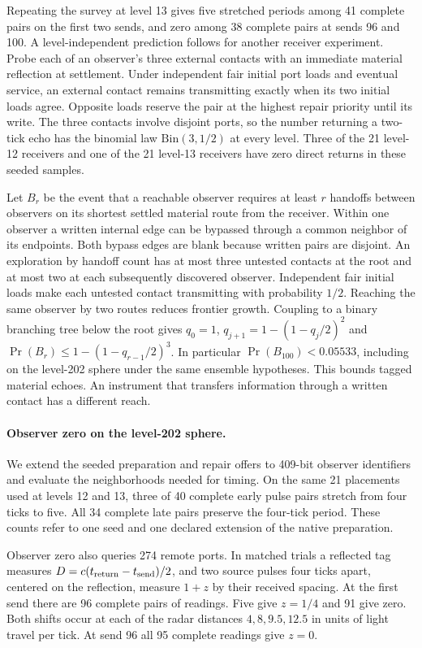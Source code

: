 \documentclass[11pt]{article}
\theoremstyle{remark}
\begin{document}
Repeating the survey at level 13 gives five stretched periods among
41 complete pairs on the first two sends, and zero among 38 complete
pairs at sends 96 and 100. A level-independent prediction follows for
another receiver experiment. Probe each of an observer's three external
contacts with an immediate material reflection at settlement. Under
independent fair initial port loads and eventual service, an external
contact remains transmitting exactly when its two initial loads agree.
Opposite loads reserve the pair at the highest repair priority until its
write. The three contacts involve disjoint ports, so the number returning
a two-tick echo has the binomial law $\mathrm{Bin}(3,1/2)$ at every level.
Three of the 21 level-12 receivers and one of the 21 level-13 receivers
have zero direct returns in these seeded samples.

Let $B_r$ be the event that a reachable observer requires at least $r$
handoffs between observers on its shortest settled material route from
the receiver. Within one observer a written internal edge can be bypassed
through a common neighbor of its endpoints. Both bypass edges are blank
because written pairs are disjoint. An exploration by handoff count has
at most three untested contacts at the root and at most two at each
subsequently discovered observer. Independent fair initial loads make
each untested contact transmitting with probability $1/2$. Reaching the
same observer by two routes reduces frontier growth. Coupling to
a binary branching tree below the root gives $q_0=1$,
$q_{j+1}=1-(1-q_j/2)^2$ and
$\Pr(B_r)\le 1-(1-q_{r-1}/2)^3$.
In particular $\Pr(B_{100})<0.05533$, including on the level-202 sphere
under the same ensemble hypotheses. This bounds tagged material echoes.
An instrument that transfers information through a written contact has
a different reach.

\paragraph{Observer zero on the level-202 sphere.}
We extend the seeded preparation and repair offers to 409-bit observer
identifiers and evaluate the neighborhoods needed for timing. On the same
21 placements used at levels 12 and 13, three of 40 complete early pulse
pairs stretch from four ticks to five. All 34 complete late pairs preserve
the four-tick period. These counts refer to one seed and one declared
extension of the native preparation.

Observer zero also queries 274 remote ports. In matched trials a reflected
tag measures $D=c(t_{\rm return}-t_{\rm send})/2$, and two source pulses
four ticks apart, centered on the reflection, measure $1+z$ by their
received spacing. At the first send there are 96 complete pairs of readings.
Five give $z=1/4$ and 91 give zero. Both shifts occur at each of the
radar distances $4,8,9.5,12.5$ in units of light travel per tick.
At send 96 all 95 complete readings give $z=0$.
\end{document}

